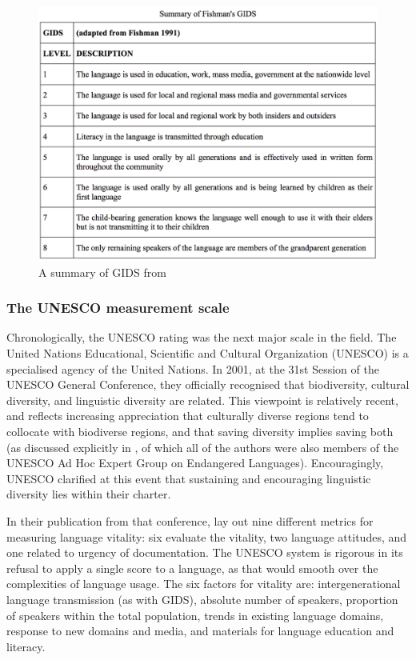 \begin{figure}
 \centering
 \includegraphics[width=.8\textwidth]{img/gids.png}
 \caption{A summary of GIDS from \citep[105]{lewis2010assessing}}
 \label{fig:gids}
\end{figure}

\subsubsection{The UNESCO measurement scale}
\label{subsec:unesco}

Chronologically, the UNESCO rating was the next major scale in the field. The United Nations Educational, Scientific and Cultural Organization (UNESCO) is a specialised agency of the United Nations. In 2001, at the 31st Session of the UNESCO General Conference, they officially recognised that biodiversity, cultural diversity, and linguistic diversity are related. This viewpoint is relatively recent, and reflects increasing appreciation that culturally diverse regions tend to collocate with biodiverse regions, and that saving diversity implies saving both \citep{nettle2000vanishing, maffi2001biocultural, anderson2006language, krauss2007keynote, gorenflo2012co} (as discussed explicitly in \citet{maffi2001}, of which all of the authors were also members of the UNESCO Ad Hoc Expert Group on Endangered Languages). Encouragingly, UNESCO clarified at this event that sustaining and encouraging linguistic diversity lies within their charter.

In their publication from that conference, \citet{brenzinger2003language} lay out nine different metrics for measuring language vitality: six evaluate the vitality, two language attitudes, and one related to urgency of documentation. The UNESCO system is rigorous in its refusal to apply a single score to a language, as that would smooth over the complexities of language usage. The six factors for vitality are: intergenerational language transmission (as with GIDS), absolute number of speakers, proportion of speakers within the total population, trends in existing language domains, response to new domains and media, and materials for language education and literacy.

